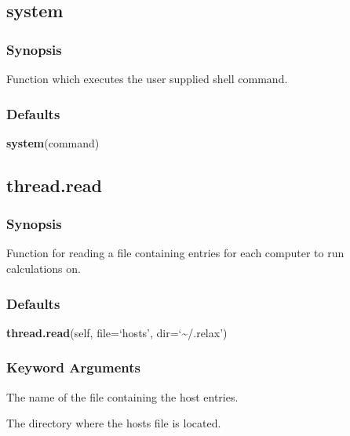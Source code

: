 


\newpage

\subsection{system}


\subsubsection{Synopsis}

Function which executes the user supplied shell command.



\subsubsection{Defaults}

\textsf{\textbf{system}(command)}



\newpage

\subsection{thread.read}


\subsubsection{Synopsis}

Function for reading a file containing entries for each computer to run calculations on.



\subsubsection{Defaults}

\textsf{\textbf{thread.read}(self, file=`hosts', dir=`\~{}/.relax')}


\subsubsection{Keyword Arguments}

  The name of the file containing the host entries. 

  The directory where the hosts file is located. 




